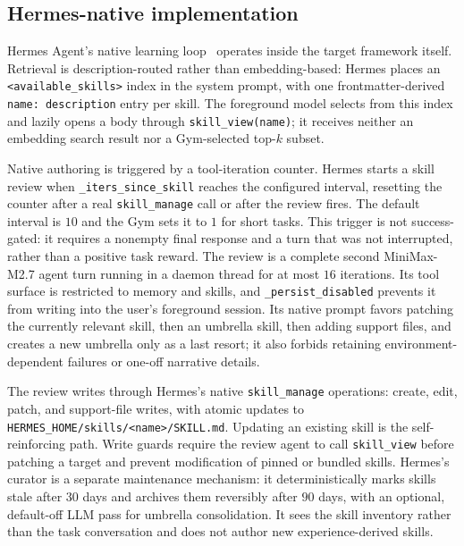 \documentclass{article}
\begin{document}
\subsection{Hermes-native implementation}

Hermes Agent's native learning loop~\citep{nousresearch2026hermesagent} operates
inside the target framework itself. Retrieval is description-routed rather than
embedding-based: Hermes places an \texttt{<available\_skills>} index in the system
prompt, with one frontmatter-derived \texttt{name: description} entry per skill.
The foreground model selects from this index and lazily opens a body through
\texttt{skill\_view(name)}; it receives neither an embedding search result nor a
Gym-selected top-$k$ subset.

Native authoring is triggered by a tool-iteration counter. Hermes starts a skill
review when \texttt{\_iters\_since\_skill} reaches the configured interval, resetting
the counter after a real \texttt{skill\_manage} call or after the review fires. The
default interval is $10$ and the Gym sets it to $1$ for short tasks. This trigger
is not success-gated: it requires a nonempty final response and a turn that was not
interrupted, rather than a positive task reward. The review is a complete second
MiniMax-M2.7 agent turn running in a daemon thread for at most $16$ iterations. Its
tool surface is restricted to memory and skills, and
\texttt{\_persist\_disabled} prevents it from writing into the user's foreground
session. Its native prompt favors patching the currently relevant skill, then an
umbrella skill, then adding support files, and creates a new umbrella only as a
last resort; it also forbids retaining environment-dependent failures or one-off
narrative details.

The review writes through Hermes's native \texttt{skill\_manage} operations:
create, edit, patch, and support-file writes, with atomic updates to
\texttt{HERMES\_HOME/skills/<name>/SKILL.md}. Updating an existing skill is the
self-reinforcing path. Write guards require the review agent to call
\texttt{skill\_view} before patching a target and prevent modification of pinned or
bundled skills. Hermes's curator is a separate maintenance mechanism: it
deterministically marks skills stale after $30$ days and archives them reversibly
after $90$ days, with an optional, default-off LLM pass for umbrella consolidation.
It sees the skill inventory rather than the task conversation and does not author
new experience-derived skills.
\end{document}

